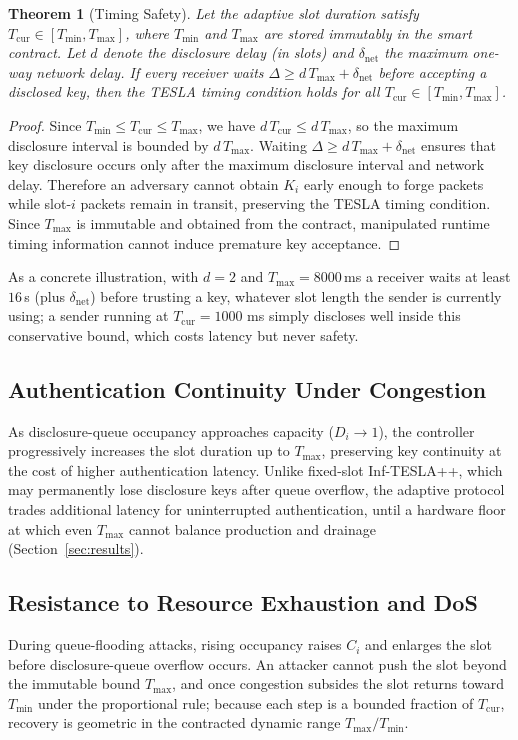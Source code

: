 \documentclass[conference]{IEEEtran}
\newtheorem{theorem}{Theorem}
\begin{document}
\begin{theorem}[Timing Safety]
Let the adaptive slot duration satisfy $T_{\mathrm{cur}}\in[T_{\min},T_{\max}]$,
where $T_{\min}$ and $T_{\max}$ are stored immutably in the smart contract. Let
$d$ denote the disclosure delay (in slots) and $\delta_{\mathrm{net}}$ the
maximum one-way network delay. If every receiver waits
$\Delta \ge d\,T_{\max}+\delta_{\mathrm{net}}$ before accepting a disclosed key,
then the TESLA timing condition holds for all
$T_{\mathrm{cur}}\in[T_{\min},T_{\max}]$.
\end{theorem}
\begin{proof}
Since $T_{\min}\le T_{\mathrm{cur}}\le T_{\max}$, we have
$d\,T_{\mathrm{cur}}\le d\,T_{\max}$, so the maximum disclosure interval is bounded
by $d\,T_{\max}$. Waiting $\Delta \ge d\,T_{\max}+\delta_{\mathrm{net}}$ ensures
that key disclosure occurs only after the maximum disclosure interval and network
delay. Therefore an adversary cannot obtain $K_i$ early enough to forge packets
while slot-$i$ packets remain in transit, preserving the TESLA timing condition.
Since $T_{\max}$ is immutable and obtained from the contract, manipulated runtime
timing information cannot induce premature key acceptance.
\end{proof}

As a concrete illustration, with $d=2$ and $T_{\max}=8000$\,ms a receiver waits at
least $16$\,s (plus $\delta_{\mathrm{net}}$) before trusting a key, whatever slot
length the sender is currently using; a sender running at $T_{\mathrm{cur}}=1000$
ms simply discloses well inside this conservative bound, which costs latency but
never safety.

\subsection{Authentication Continuity Under Congestion}
As disclosure-queue occupancy approaches capacity ($D_i\!\rightarrow\!1$), the
controller progressively increases the slot duration up to $T_{\max}$, preserving
key continuity at the cost of higher authentication latency. Unlike fixed-slot
Inf-TESLA++, which may permanently lose disclosure keys after queue overflow, the
adaptive protocol trades additional latency for uninterrupted authentication,
until a hardware floor at which even $T_{\max}$ cannot balance production and
drainage (Section~\ref{sec:results}).

\subsection{Resistance to Resource Exhaustion and DoS}
During queue-flooding attacks, rising occupancy raises $C_i$ and enlarges the
slot before disclosure-queue overflow occurs. An attacker cannot push the slot
beyond the immutable bound $T_{\max}$, and once congestion subsides the slot
returns toward $T_{\min}$ under the proportional rule; because each step is a
bounded fraction of $T_{\mathrm{cur}}$, recovery is geometric in the contracted
dynamic range $T_{\max}/T_{\min}$.
\end{document}

